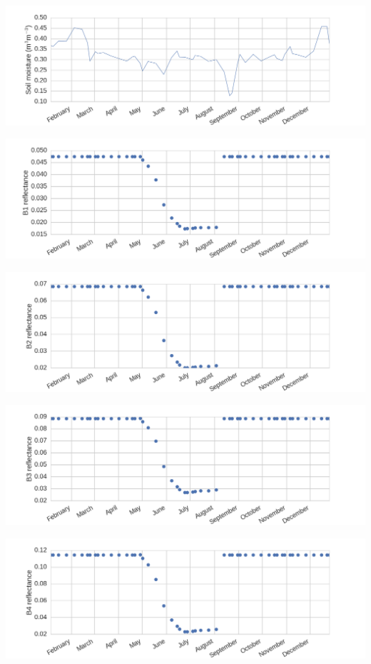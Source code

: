 \documentclass[letterpaper,10pt,english]{sphinxmanual}
\begin{document}
\includegraphics{soil_m.png}

\includegraphics{B1.png}

\includegraphics{B2.png}

\includegraphics{B3.png}

\includegraphics{B4.png}
\end{document}
